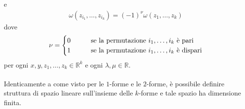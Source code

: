 \documentclass[oneside, 11pt]{amsbook}
\newcommand{\0}{{(0)}}
\newcommand{\3}{{(3)}}
\theoremstyle{colonplain}
\theoremstyle{colondefinition}
\theoremstyle{colonremark}
\numberwithin{equation}{chapter}
\begin{document}
e
\begin{align}
    \omega(z_{i_1}, \dots, z_{i_k}) = (-1)^\nu\omega(z_1, \dots, z_k)
\end{align}
dove 
\begin{align}
    \nu = 
    \begin{cases}
        0 \qquad &\text{se la permutazione } i_1, \dots, i_k \text{ è pari} \\
        1 \qquad &\text{se la permutazione } i_1, \dots, i_k \text{ è dispari}
    \end{cases} \notag
\end{align}
per ogni $x, y, z_1, \dots, z_k \in \mathbb{R}^k$ e ogni $\lambda, \mu \in \mathbb{R}$. \\ \\
Identicamente a come visto per le $1$-forme e le $2$-forme, è possibile definire struttura di spazio lineare sull'insieme delle $k$-forme e tale spazio ha dimensione finita.
\end{document}
